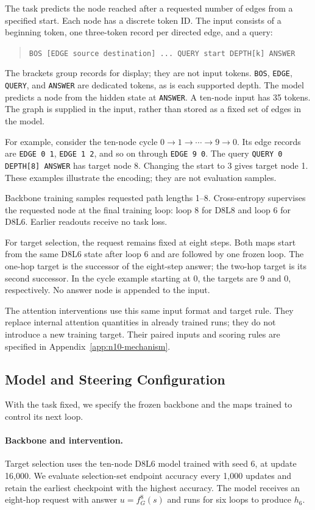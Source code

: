 \documentclass{article}
\begin{document}
The task predicts the node reached after a requested number of edges from a specified start. Each node has a discrete token ID. The input consists of a beginning token, one three-token record per directed edge, and a query:
\begin{quote}
\texttt{BOS [EDGE source destination] ... QUERY start DEPTH[k] ANSWER}
\end{quote}
The brackets group records for display; they are not input tokens. \texttt{BOS}, \texttt{EDGE}, \texttt{QUERY}, and \texttt{ANSWER} are dedicated tokens, as is each supported depth. The model predicts a node from the hidden state at \texttt{ANSWER}. A ten-node input has 35 tokens. The graph is supplied in the input, rather than stored as a fixed set of edges in the model.

For example, consider the ten-node cycle $0\to1\to\cdots\to9\to0$. Its edge records are \texttt{EDGE 0 1}, \texttt{EDGE 1 2}, and so on through \texttt{EDGE 9 0}. The query \texttt{QUERY 0 DEPTH[8] ANSWER} has target node 8. Changing the start to 3 gives target node 1. These examples illustrate the encoding; they are not evaluation samples.

Backbone training samples requested path lengths 1--8. Cross-entropy supervises the requested node at the final training loop: loop 8 for D8L8 and loop 6 for D8L6. Earlier readouts receive no task loss.

For target selection, the request remains fixed at eight steps. Both maps start from the same D8L6 state after loop 6 and are followed by one frozen loop. The one-hop target is the successor of the eight-step answer; the two-hop target is its second successor. In the cycle example starting at 0, the targets are 9 and 0, respectively. No answer node is appended to the input.

The attention interventions use this same input format and target rule. They replace internal attention quantities in already trained runs; they do not introduce a new training target. Their paired inputs and scoring rules are specified in Appendix~\ref{app:n10-mechanism}.

\subsection{Model and Steering Configuration}
\label{app:target-setup}
With the task fixed, we specify the frozen backbone and the maps trained to control its next loop.

\paragraph{Backbone and intervention.}
Target selection uses the ten-node D8L6 model trained with seed 6, at update 16,000. We evaluate selection-set endpoint accuracy every 1,000 updates and retain the earliest checkpoint with the highest accuracy. The model receives an eight-hop request with answer $u=f_G^8(s)$ and runs for six loops to produce $h_6$.
\end{document}
